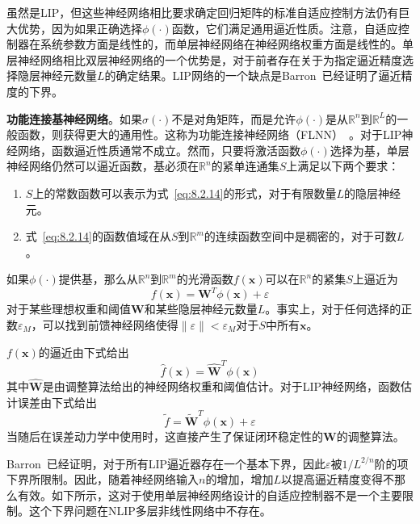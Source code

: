 \documentclass[12pt,a4paper]{ctexart}
\begin{document}
虽然是LIP，但这些神经网络相比要求确定回归矩阵的标准自适应控制方法仍有巨大优势，因为如果正确选择$\phi(\cdot)$函数，它们满足通用逼近性质。注意，自适应控制器在系统参数方面是线性的，而单层神经网络在神经网络权重方面是线性的。单层神经网络相比双层神经网络的一个优势是，对于前者存在关于为指定逼近精度选择隐层神经元数量$L$的确定结果。LIP网络的一个缺点是Barron~\cite{barron1993}已经证明了逼近精度的下界。

\textbf{功能连接基神经网络}。如果$\sigma(\cdot)$不是对角矩阵，而是允许$\phi(\cdot)$是从$\mathbb{R}^n$到$\mathbb{R}^L$的一般函数，则获得更大的通用性。这称为功能连接神经网络（FLNN）~\cite{sadegh1993}。对于LIP神经网络，函数逼近性质通常不成立。然而，只要将激活函数$\phi(\cdot)$选择为基，单层神经网络仍然可以逼近函数，基必须在$\mathbb{R}^n$的紧单连通集$S$上满足以下两个要求：

\begin{enumerate}
    \item $S$上的常数函数可以表示为式~\eqref{eq:8.2.14}的形式，对于有限数量$L$的隐层神经元。
    \item 式~\eqref{eq:8.2.14}的函数值域在从$S$到$\mathbb{R}^m$的连续函数空间中是稠密的，对于可数$L$。
\end{enumerate}

如果$\phi(\cdot)$提供基，那么从$\mathbb{R}^n$到$\mathbb{R}^m$的光滑函数$f(\bm{x})$可以在$\mathbb{R}^n$的紧集$S$上逼近为
\begin{equation}\label{eq:8.2.15}
f(\bm{x}) = \bm{W}^T \phi(\bm{x}) + \varepsilon
\end{equation}
对于某些理想权重和阈值$\bm{W}$和某些隐层神经元数量$L$。事实上，对于任何选择的正数$\varepsilon_M$，可以找到前馈神经网络使得$\|\varepsilon\| < \varepsilon_M$对于$S$中所有$\bm{x}$。

$f(\bm{x})$的逼近由下式给出
\begin{equation}\label{eq:8.2.16}
\hat{f}(\bm{x}) = \hat{\bm{W}}^T \phi(\bm{x})
\end{equation}
其中$\hat{\bm{W}}$是由调整算法给出的神经网络权重和阈值估计。对于LIP神经网络，函数估计误差由下式给出
\begin{equation}\label{eq:8.2.17}
\tilde{f} = \tilde{\bm{W}}^T \phi(\bm{x}) + \varepsilon
\end{equation}
当随后在误差动力学中使用时，这直接产生了保证闭环稳定性的$\bm{W}$的调整算法。

Barron~\cite{barron1993}已经证明，对于所有LIP逼近器存在一个基本下界，因此$\varepsilon$被$1/L^{2/n}$阶的项下界所限制。因此，随着神经网络输入$n$的增加，增加$L$以提高逼近精度变得不那么有效。如下所示，这对于使用单层神经网络设计的自适应控制器不是一个主要限制。这个下界问题在NLIP多层非线性网络中不存在。
\end{document}
